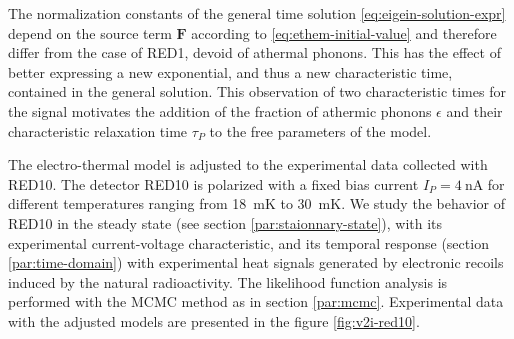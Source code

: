 The normalization constants of the general time solution \ref{eq:eigein-solution-expr} depend on the source term $\bm{F}$ according to \ref{eq:ethem-initial-value} and therefore differ from the case of RED1, devoid of athermal phonons. This has the effect of better expressing a new exponential, and thus a new characteristic time, contained in the general solution. This observation of two characteristic times for the signal motivates the addition of the fraction of athermic phonons $\epsilon$ and their characteristic relaxation time $\tau_P$ to the free parameters of the model.

The electro-thermal model is adjusted to the experimental data collected with RED10. The detector RED10 is polarized with a fixed bias current $I_P = \SI{4}{\nano\ampere}$ for different temperatures ranging from \SI{18}{\milli\kelvin} to \SI{30}{\milli\kelvin}. We study the behavior of RED10 in the steady state (see section \ref{par:staionnary-state}), with its experimental current-voltage characteristic, and its temporal response (section \ref{par:time-domain}) with experimental heat signals generated by electronic recoils induced by the natural radioactivity. The likelihood function analysis is performed with the MCMC method as in section \ref{par:mcmc}. Experimental data with the adjusted models are presented in the figure \ref{fig:v2i-red10}.

